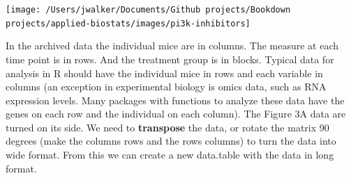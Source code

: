 \documentclass[]{book}
\begin{document}
\texttt{[image: /Users/jwalker/Documents/Github projects/Bookdown projects/applied-biostats/images/pi3k-inhibitors]}

In the archived data the individual mice are in columns. The measure at each time point is in rows. And the treatment group is in blocks. Typical data for analysis in R should have the individual mice in rows and each variable in columns (an exception in experimental biology is omics data, such as RNA expression levels. Many packages with functions to analyze these data have the genes on each row and the individual on each column). The Figure 3A data are turned on its side. We need to \textbf{transpose} the data, or rotate the matrix 90 degrees (make the columns rows and the rows columns) to turn the data into wide format. From this we can create a new data.table with the data in long format.
\end{document}
